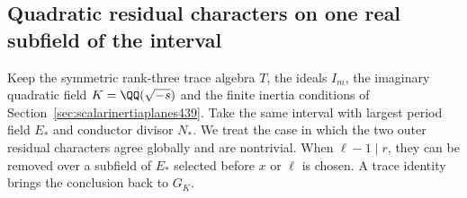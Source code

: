 \documentclass[a4paper,11pt]{article}
\theoremstyle{definition}
\theoremstyle{remark}
\numberwithin{equation}{section}
\begin{document}
\subsection{Quadratic residual characters on one real subfield of the interval}
\label{sec:realquadratictrace442}

Keep the symmetric rank-three trace algebra \(T\), the ideals
\(I_m\), the imaginary quadratic field \(K=\QQ(\sqrt{-s})\)
and the finite inertia conditions of
Section~\ref{sec:scalarinertiaplanes439}. Take the same interval
with largest period field \(E_*\) and conductor divisor \(N_*\).
We treat the case in which the two outer residual characters
agree globally and are nontrivial. When \(\ell-1\mid r\), they can
be removed over a subfield of \(E_*\) selected before \(x\) or
\(\ell\) is chosen. A trace identity brings the conclusion back
to \(G_K\).
\end{document}

